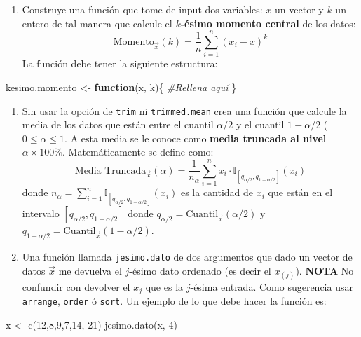 \documentclass[
]{book}
\newenvironment{Shaded}{\begin{snugshade}}{\end{snugshade}}
\newcommand{\CommentTok}[1]{\textcolor[rgb]{0.56,0.35,0.01}{\textit{#1}}}
\newcommand{\ControlFlowTok}[1]{\textcolor[rgb]{0.13,0.29,0.53}{\textbf{#1}}}
\newcommand{\DecValTok}[1]{\textcolor[rgb]{0.00,0.00,0.81}{#1}}
\newcommand{\FunctionTok}[1]{\textcolor[rgb]{0.00,0.00,0.00}{#1}}
\newcommand{\NormalTok}[1]{#1}
\newcommand{\OtherTok}[1]{\textcolor[rgb]{0.56,0.35,0.01}{#1}}
\providecommand{\tightlist}{%
  \setlength{\itemsep}{0pt}\setlength{\parskip}{0pt}}
\begin{document}
\begin{enumerate}
\def\labelenumi{\arabic{enumi}.}
\tightlist
\item
  Construye una función que tome de input dos variables: \(x\) un vector y \(k\) un entero de tal manera que calcule el \textbf{\(k\)-ésimo momento central} de los datos:
  \[
  \text{Momento}_{\vec{x}}(k) = \frac{1}{n} \sum\limits_{i=1}^n (x_i - \bar{x})^k
  \]
  La función debe tener la siguiente estructura:
\end{enumerate}

\begin{Shaded}
\begin{Highlighting}[]
\NormalTok{kesimo.momento }\OtherTok{\textless{}{-}} \ControlFlowTok{function}\NormalTok{(x, k)\{}
  \CommentTok{\#Rellena aquí}
\NormalTok{\}}
\end{Highlighting}
\end{Shaded}

\begin{enumerate}
\def\labelenumi{\arabic{enumi}.}
\setcounter{enumi}{1}
\item
  Sin usar la opción de \texttt{trim} ni \texttt{trimmed.mean} crea una función que calcule la media de los datos que están entre el cuantil \(\alpha/2\) y el cuantil \(1 - \alpha/2\) (\(0 \leq \alpha \leq 1\). A esta media se le conoce como \textbf{media truncada al nivel \(\alpha \times 100\%\)}. Matemáticamente se define como:
  \[
  \textrm{Media Truncada}_{\vec{x}}(\alpha) = \frac{1}{n_\alpha} \sum\limits_{i = 1}^{n} x_i \cdot  \mathbb{I}_{[q_{\alpha/2}, q_{1-\alpha/2}]}(x_i)
  \]
  donde \(n_{\alpha} = \sum_{i=1}^n \mathbb{I}_{[q_{\alpha/2}, q_{1-\alpha/2}]}(x_i)\) es la cantidad de \(x_i\) que están en el intervalo \([q_{\alpha/2}, q_{1-\alpha/2}]\) donde \(q_{\alpha/2} = \text{Cuantil}_{\vec{x}}(\alpha/2)\) y \(q_{1 - \alpha/2} = \text{Cuantil}_{\vec{x}}(1 - \alpha/2)\).
\item
  Una función llamada \texttt{jesimo.dato} de dos argumentos que dado un vector de datos \(\vec{x}\) me devuelva el \(j\)-ésimo dato ordenado (es decir el \(x_{(j)}\)). \textbf{NOTA} No confundir con devolver el \(x_j\) que es la \(j\)-ésima entrada. Como sugerencia usar \texttt{arrange}, \texttt{order} ó \texttt{sort}. Un ejemplo de lo que debe hacer la función es:
\end{enumerate}

\begin{Shaded}
\begin{Highlighting}[]
\NormalTok{x }\OtherTok{\textless{}{-}} \FunctionTok{c}\NormalTok{(}\DecValTok{12}\NormalTok{,}\DecValTok{8}\NormalTok{,}\DecValTok{9}\NormalTok{,}\DecValTok{7}\NormalTok{,}\DecValTok{14}\NormalTok{, }\DecValTok{21}\NormalTok{)}
\FunctionTok{jesimo.dato}\NormalTok{(x, }\DecValTok{4}\NormalTok{)}
\end{Highlighting}
\end{Shaded}
\end{document}
